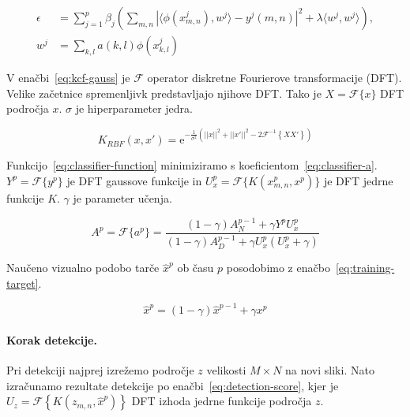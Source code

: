 \begin{equation}
\begin{aligned}
\epsilon &= \sum_{j=1}^p \beta_j \left( 
	\sum_{m,n} \left| \langle \phi\left(x_{m,n}^j \right), w^j \rangle - y^j(m,n) \right|^2
    + \lambda \langle w^j, w^j \rangle
\right), \\
w^j &= \sum_{k,l} a(k,l) \phi\left(x_{k,l}^j  \right)
\end{aligned}
\label{eq:classifier-function}
\end{equation}

V enačbi~\eqref{eq:kcf-gauss} je $\mathcal{F}$ operator diskretne Fourierove transformacije (DFT). Velike začetnice spremenljivk predstavljajo njihove DFT. Tako je $X = \mathcal{F}\{ {x} \}$ DFT področja $x$. $\sigma$ je hiperparameter jedra.

\begin{equation}
K_{RBF}({x}, {x}') = \mathrm{e}^{-\frac{1}{\sigma^2}\left(
	||{x}||^2 + ||{x}'||^2 - 2 \mathcal{F}^{-1}\left\{ {X} {X}' \right\}
\right)}
\label{eq:kcf-gauss}
\end{equation}

Funkcijo~\eqref{eq:classifier-function} minimiziramo s koeficientom~\eqref{eq:classifier-a}.  $Y^p = \mathcal{F}\{y^p\}$ je DFT gaussove funkcije in $U_x^p = \mathcal{F}\{ K(x_{m,n}^p, x^p) \}$ je DFT jedrne funkcije $K$. $\gamma$ je parameter učenja.

\begin{equation}
A^p = \mathcal{F}\{a^p\} =  \frac{(1- \gamma) A_N^{p-1} + \gamma Y^p U_x^p}
{(1- \gamma)A_D^{p-1} + \gamma U_x^p\left( U_x^p + \gamma \right)}
\label{eq:classifier-a}
\end{equation}

Naučeno vizualno podobo tarče $\hat{x}^p$ ob času $p$ posodobimo z enačbo~\eqref{eq:training-target}.

\begin{equation}
\hat{x}^p = (1 - \gamma) \hat{x}^{p-1} + \gamma x^p
\label{eq:training-target}
\end{equation}


\paragraph{Korak detekcije.}
Pri detekciji najprej izrežemo področje $z$ velikosti $M \times N$ na novi sliki. Nato izračunamo rezultate detekcije po enačbi~\eqref{eq:detection-score}, kjer je $U_z = \mathcal{F}\left\{ K\left( z_{m,n}, \hat{x}^{p}  \right) \right\}$ DFT izhoda jedrne funkcije področja $z$.

